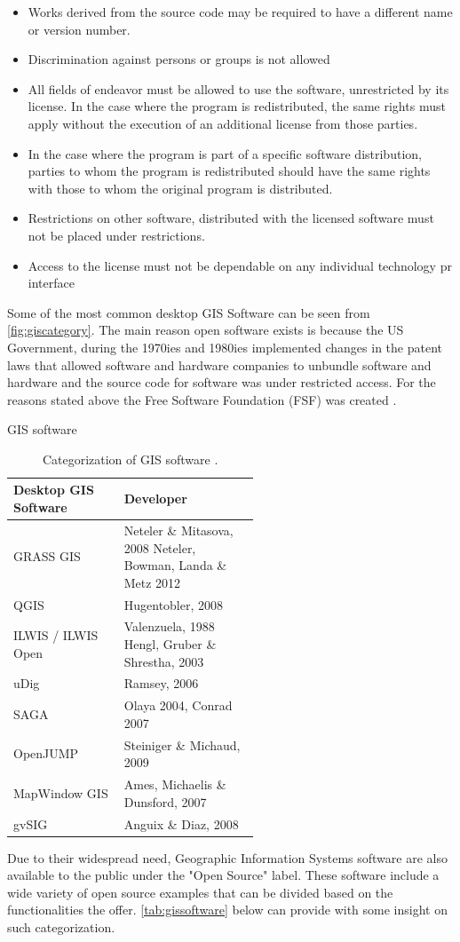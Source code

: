 \begin{itemize}
\item Works derived from the source code may be required to have a different name or version number.
\item Discrimination against persons or groups is not allowed
\item All fields of endeavor must be allowed to use the software, unrestricted by its license. In the case where the program is redistributed, the same rights must apply without the execution of an additional license from those parties.
\item In the case where the program is part of a specific software distribution, parties to whom the program is redistributed should have the same rights with those to  whom the original program is distributed.
\item Restrictions on other software, distributed with the licensed software must not be placed under restrictions.
\item Access to the license must not be dependable on any individual technology pr interface
\end{itemize}

Some of the most common desktop GIS Software can be seen from \autoref{fig:giscategory}.
The main reason open software exists is because the US Government, during the 1970ies and 1980ies implemented changes in the patent laws that allowed software and hardware companies to unbundle software and hardware and the source code for software was under restricted access. For the reasons stated above the Free Software Foundation (FSF) was created \citep{osbookde}.

\begin{table}[H]
\caption{GIS software}
\begin{tabular}{ l | p{0.55\linewidth} }
Desktop GIS Software & Developer \\ 
\hline
GRASS GIS & Neteler \& Mitasova, 2008 \newline
Neteler, Bowman, Landa \& Metz 2012 \\ 
\hline
QGIS & Hugentobler, 2008 \\ 
\hline
ILWIS / ILWIS Open & Valenzuela, 1988 \newline
Hengl, Gruber \& Shrestha, 2003 \\ 
\hline
uDig & Ramsey, 2006 \\ 
\hline
SAGA & Olaya 2004, Conrad 2007  \\ 
\hline
OpenJUMP & Steiniger \& Michaud, 2009 \\ 
\hline
MapWindow GIS & Ames, Michaelis \& Dunsford, 2007 \\ 
\hline
gvSIG & Anguix \& Diaz, 2008 \\ 
\hline
\end{tabular}
\caption*{Categorization of GIS software \citep{osarticle}.}
\label{tab:gissoftware}
\end{table}

Due to their widespread need, Geographic Information Systems software are also available to the public under the "Open Source" label. These software include a wide variety of open source examples that can be divided based on the functionalities the offer. \autoref{tab:gissoftware} below can provide with some insight on such categorization. 

